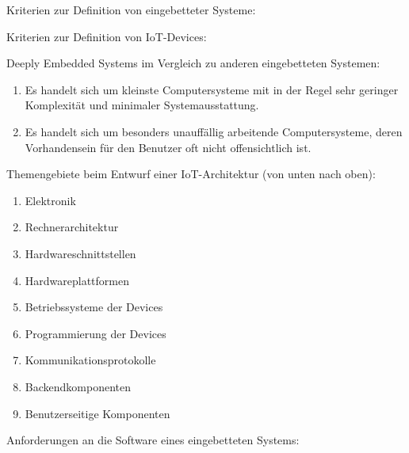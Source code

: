 \clearpage
\LoesungHeader

\teilaufgabe
Kriterien zur Definition von eingebetteter Systeme:

\teilaufgabe
Kriterien zur Definition von IoT-Devices:

\teilaufgabe
\glqq Deeply Embedded Systems\grqq{} im Vergleich zu anderen eingebetteten Systemen:

\begin{enumerate}
    \item Es handelt sich um kleinste Computersysteme mit in der Regel sehr
    geringer Komplexität und minimaler Systemausstattung.

    \setcounter{enumi}{2}   %
    \item Es handelt sich um besonders unauffällig arbeitende Computersysteme,
    deren Vorhandensein für den Benutzer oft nicht offensichtlich ist.
\end{enumerate}

\teilaufgabe
Themengebiete beim Entwurf einer IoT-Architektur (von unten nach oben):

\begin{enumerate}
    \item Elektronik
    \item Rechnerarchitektur
    \item Hardwareschnittstellen
    \item Hardwareplattformen
    \item Betriebssysteme der Devices
    \item Programmierung der Devices
    \item Kommunikationsprotokolle
    \item Backendkomponenten
    \item Benutzerseitige Komponenten
\end{enumerate}

\bigskip
\teilaufgabe
Anforderungen an die Software eines eingebetteten Systems:

